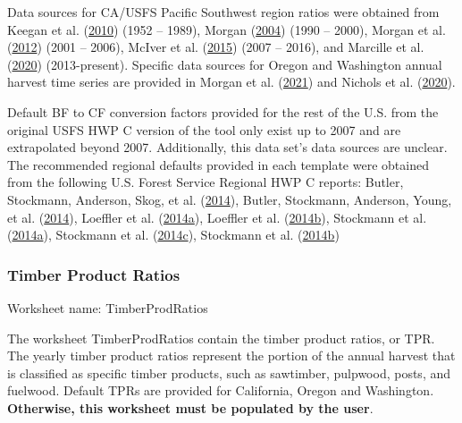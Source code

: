 \documentclass[
  openany]{book}
\begin{document}
Data sources for CA/USFS Pacific Southwest region ratios were obtained
from Keegan et al. (\protect\hyperlink{ref-keegan2010}{2010}) (1952 --
1989), Morgan (\protect\hyperlink{ref-morgan2004}{2004}) (1990 -- 2000),
Morgan et al. (\protect\hyperlink{ref-morgan2012}{2012}) (2001 -- 2006),
McIver et al. (\protect\hyperlink{ref-mciver2015}{2015}) (2007 -- 2016),
and Marcille et al. (\protect\hyperlink{ref-marcille2020}{2020})
(2013-present). Specific data sources for Oregon and Washington annual
harvest time series are provided in Morgan et al.
(\protect\hyperlink{ref-morgan2021}{2021}) and Nichols et al.
(\protect\hyperlink{ref-nichols2020}{2020}).

Default BF to CF conversion factors provided for the rest of the U.S.
from the original USFS HWP C version of the tool only exist up to 2007
and are extrapolated beyond 2007. Additionally, this data set's data
sources are unclear. The recommended regional defaults provided in each
template were obtained from the following U.S. Forest Service Regional
HWP C reports: Butler, Stockmann, Anderson, Skog, et al.
(\protect\hyperlink{ref-butler2014nw}{2014}), Butler, Stockmann,
Anderson, Young, et al. (\protect\hyperlink{ref-butler2014sw}{2014}),
Loeffler et al. (\protect\hyperlink{ref-loeffler2014er}{2014a}),
Loeffler et al. (\protect\hyperlink{ref-loeffler2014sr}{2014b}),
Stockmann et al. (\protect\hyperlink{ref-stockmann2014nr}{2014a}),
Stockmann et al. (\protect\hyperlink{ref-stockmann2014imr}{2014c}),
Stockmann et al. (\protect\hyperlink{ref-stockmann2014rmr}{2014b})

\hypertarget{own-prov-input-tpr}{%
\subsubsection{Timber Product Ratios}\label{own-prov-input-tpr}}

Worksheet name: TimberProdRatios

The worksheet TimberProdRatios contain the timber product ratios, or
TPR. The yearly timber product ratios represent the portion of the
annual harvest that is classified as specific timber products, such as
sawtimber, pulpwood, posts, and fuelwood. Default TPRs are provided for
California, Oregon and Washington. \textbf{Otherwise, this worksheet
must be populated by the user}.
\end{document}
